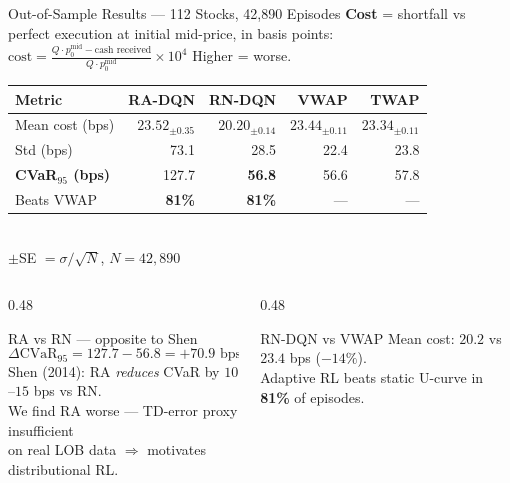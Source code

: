 \documentclass[aspectratio=169, 10pt]{beamer}
\begin{document}
\begin{frame}{Out-of-Sample Results — 112 Stocks, 42,890 Episodes}
  \footnotesize
  \textbf{Cost} = shortfall vs perfect execution at initial mid-price, in basis points:
  $\displaystyle\text{cost} = \frac{Q\cdot p_0^{\text{mid}} - \text{cash received}}{Q\cdot p_0^{\text{mid}}}\times 10^4$
  \quad Higher = worse.

  \smallskip
  \begin{center}
  \renewcommand{\arraystretch}{1.4}
  \begin{tabular}{lrrrr}
    \toprule
    \textbf{Metric}
      & \textcolor{myblue}{\textbf{RA-DQN}}
      & \textcolor{myred}{\textbf{RN-DQN}}
      & \textcolor{mygreen}{\textbf{VWAP}}
      & \textcolor{mypurple}{\textbf{TWAP}} \\
    \midrule
    Mean cost (bps)
      & $23.52_{\pm0.35}$ & $\mathbf{20.20}_{\pm0.14}$ & $23.44_{\pm0.11}$ & $23.34_{\pm0.11}$ \\
    Std (bps)
      & 73.1  & 28.5  & 22.4  & 23.8  \\
    \textbf{CVaR$_{95}$ (bps)}
      & 127.7 & \textbf{56.8} & 56.6  & 57.8  \\
    \midrule
    Beats VWAP & \textbf{81\%} & \textbf{81\%} & — & — \\
    \bottomrule
  \end{tabular}\\[4pt]
  \scriptsize $\pm$SE $= \sigma/\sqrt{N}$,\; $N{=}42{,}890$
  \end{center}

  \begin{columns}[T]
    \begin{column}{0.48\textwidth}
      \begin{block}{RA vs RN — opposite to Shen}
        $$\Delta\text{CVaR}_{95} = 127.7 - 56.8 = \mathbf{+70.9}\text{ bps}$$
        Shen (2014): RA \emph{reduces} CVaR by $10$--$15$ bps vs RN.\\
        We find RA \alert{worse} — TD-error proxy insufficient\\
        on real LOB data $\Rightarrow$ motivates distributional RL.
      \end{block}
    \end{column}
    \begin{column}{0.48\textwidth}
      \begin{block}{RN-DQN vs VWAP}
        Mean cost: $\mathbf{20.2}$ vs $23.4$ bps ($-14\%$).\\
        Adaptive RL beats static U-curve in \textbf{81\%} of episodes.
      \end{block}
    \end{column}
  \end{columns}
\end{frame}
\end{document}
